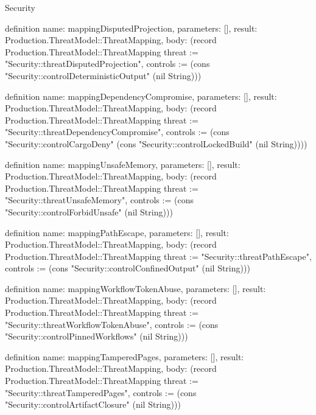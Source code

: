 \begin{lexlean}{Security}
\begin{semanticmodule}
{definition{
  name: mappingDisputedProjection,
  parameters: [],
  result: Production.ThreatModel::ThreatMapping,
  body: (record Production.ThreatModel::ThreatMapping {threat := "Security::threatDisputedProjection", controls := (cons "Security::controlDeterministicOutput" (nil String))})
}

definition{
  name: mappingDependencyCompromise,
  parameters: [],
  result: Production.ThreatModel::ThreatMapping,
  body: (record Production.ThreatModel::ThreatMapping {threat := "Security::threatDependencyCompromise", controls := (cons "Security::controlCargoDeny" (cons "Security::controlLockedBuild" (nil String)))})
}

definition{
  name: mappingUnsafeMemory,
  parameters: [],
  result: Production.ThreatModel::ThreatMapping,
  body: (record Production.ThreatModel::ThreatMapping {threat := "Security::threatUnsafeMemory", controls := (cons "Security::controlForbidUnsafe" (nil String))})
}

definition{
  name: mappingPathEscape,
  parameters: [],
  result: Production.ThreatModel::ThreatMapping,
  body: (record Production.ThreatModel::ThreatMapping {threat := "Security::threatPathEscape", controls := (cons "Security::controlConfinedOutput" (nil String))})
}

definition{
  name: mappingWorkflowTokenAbuse,
  parameters: [],
  result: Production.ThreatModel::ThreatMapping,
  body: (record Production.ThreatModel::ThreatMapping {threat := "Security::threatWorkflowTokenAbuse", controls := (cons "Security::controlPinnedWorkflows" (nil String))})
}

definition{
  name: mappingTamperedPages,
  parameters: [],
  result: Production.ThreatModel::ThreatMapping,
  body: (record Production.ThreatModel::ThreatMapping {threat := "Security::threatTamperedPages", controls := (cons "Security::controlArtifactClosure" (nil String))})
}

}
\end{semanticmodule}
\end{lexlean}
